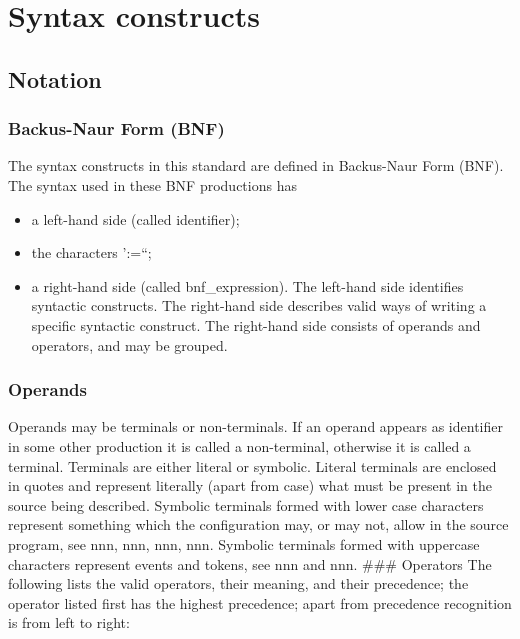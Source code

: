 \chapter{Syntax constructs}\label{syntax-constructs}

\section{Notation}\label{notation}

\subsection{Backus-Naur Form (BNF)}\label{backus-naur-form-bnf}

The syntax constructs in this standard are defined in Backus-Naur Form
(BNF). The syntax used in these BNF productions has

\begin{itemize}
\item
  a left-hand side (called identifier);
\item
  the characters ':=``;
\item
  a right-hand side (called bnf\_expression). The left-hand side
  identifies syntactic constructs. The right-hand side describes valid
  ways of writing a specific syntactic construct. The right-hand side
  consists of operands and operators, and may be grouped.
\end{itemize}

\subsection{Operands}\label{operands}

Operands may be terminals or non-terminals. If an operand appears as
identifier in some other production it is called a non-terminal,
otherwise it is called a terminal. Terminals are either literal or
symbolic. Literal terminals are enclosed in quotes and represent
literally (apart from case) what must be present in the source being
described. Symbolic terminals formed with lower case characters
represent something which the configuration may, or may not, allow in
the source program, see nnn, nnn, nnn, nnn. Symbolic terminals formed
with uppercase characters represent events and tokens, see nnn and nnn.
\#\#\# Operators The following lists the valid operators, their meaning,
and their precedence; the operator listed first has the highest
precedence; apart from precedence recognition is from left to right:

